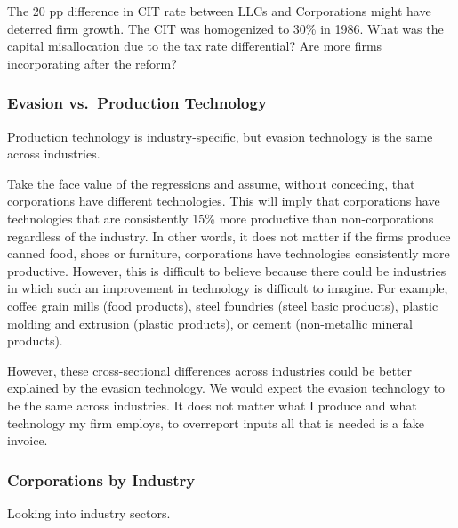 \documentclass[
  12pt]{article}
\theoremstyle{definition}
\theoremstyle{remark}
\begin{document}
The 20 pp difference in CIT rate between LLCs and Corporations might
have deterred firm growth. The CIT was homogenized to 30\% in 1986. What
was the capital misallocation due to the tax rate differential? Are more
firms incorporating after the reform?

\subsubsection{Evasion vs.~Production
Technology}\label{evasion-vs.-production-technology}

Production technology is industry-specific, but evasion technology is
the same across industries.

Take the face value of the regressions and assume, without conceding,
that corporations have different technologies. This will imply that
corporations have technologies that are consistently 15\% more
productive than non-corporations regardless of the industry. In other
words, it does not matter if the firms produce canned food, shoes or
furniture, corporations have technologies consistently more productive.
However, this is difficult to believe because there could be industries
in which such an improvement in technology is difficult to imagine. For
example, coffee grain mills (food products), steel foundries (steel
basic products), plastic molding and extrusion (plastic products), or
cement (non-metallic mineral products).

However, these cross-sectional differences across industries could be
better explained by the evasion technology. We would expect the evasion
technology to be the same across industries. It does not matter what I
produce and what technology my firm employs, to overreport inputs all
that is needed is a fake invoice.

\subsubsection{Corporations by Industry}\label{corporations-by-industry}

Looking into industry sectors.
\end{document}

